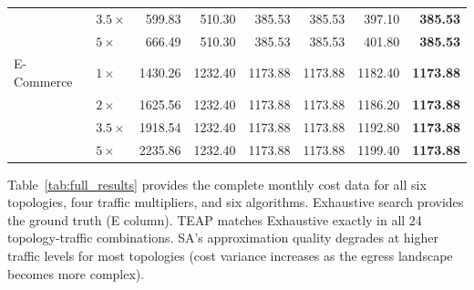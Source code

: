 \documentclass[10pt,journal]{IEEEtran}
\begin{document}
\begin{table}[!t]
\begin{tabular}{llrrrrrr}
  & $3.5\times$ &599.83& 510.30 & 385.53 & 385.53 & 397.10 & \textbf{385.53}\\
  & $5\times$ & 666.49 & 510.30 & 385.53 & 385.53 & 401.80 & \textbf{385.53}\\
\midrule
E-Commerce
  & $1\times$ &1430.26&1232.40 &1173.88 &1173.88 &1182.40& \textbf{1173.88}\\
  & $2\times$ &1625.56&1232.40 &1173.88 &1173.88 &1186.20& \textbf{1173.88}\\
  & $3.5\times$&1918.54&1232.40&1173.88 &1173.88 &1192.80& \textbf{1173.88}\\
  & $5\times$ &2235.86&1232.40 &1173.88 &1173.88 &1199.40& \textbf{1173.88}\\
\bottomrule
\end{tabular}
\end{table}

Table~\ref{tab:full_results} provides the complete monthly cost data for all
six topologies, four traffic multipliers, and six algorithms.
Exhaustive search provides the ground truth (E column).
TEAP matches Exhaustive exactly in all 24 topology-traffic combinations.
SA's approximation quality degrades at higher traffic levels for most topologies
(cost variance increases as the egress landscape becomes more complex).
\end{document}
